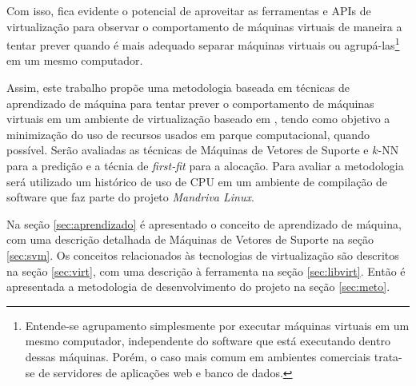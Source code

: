 Com isso, fica evidente o potencial de aproveitar as ferramentas e APIs de
virtualização para observar o comportamento de máquinas virtuais de maneira
a tentar prever quando é mais adequado separar máquinas virtuais ou
agrupá-las\footnote{Entende-se agrupamento simplesmente por
executar máquinas virtuais em um mesmo computador, independente do software
que está executando dentro dessas máquinas. Porém, o caso mais comum em
ambientes comerciais trata-se de servidores de aplicações web e banco de
dados.} em um mesmo computador. 

Assim, este trabalho propõe uma metodologia baseada em técnicas de
aprendizado de máquina para tentar prever o comportamento de máquinas
virtuais em um ambiente de virtualização baseado em \libvirt{}, tendo como
objetivo a minimização do uso de recursos usados em parque computacional,
quando possível. Serão avaliadas as técnicas de Máquinas de Vetores de
Suporte e $k$-NN para a predição e a técnia de \emph{first-fit} para a
alocação. Para avaliar a metodologia será utilizado um histórico de uso de
CPU em um ambiente de compilação de software que faz parte do projeto
\emph{Mandriva Linux}.

Na seção \ref{sec:aprendizado} é apresentado o conceito de aprendizado de
máquina, com uma descrição detalhada de Máquinas de Vetores de Suporte na
seção \ref{sec:svm}. Os conceitos relacionados às tecnologias de
virtualização são descritos na seção \ref{sec:virt}, com uma descrição à
ferramenta \libvirt{} na seção \ref{sec:libvirt}. Então é apresentada a
metodologia de desenvolvimento do projeto na seção \ref{sec:meto}.
